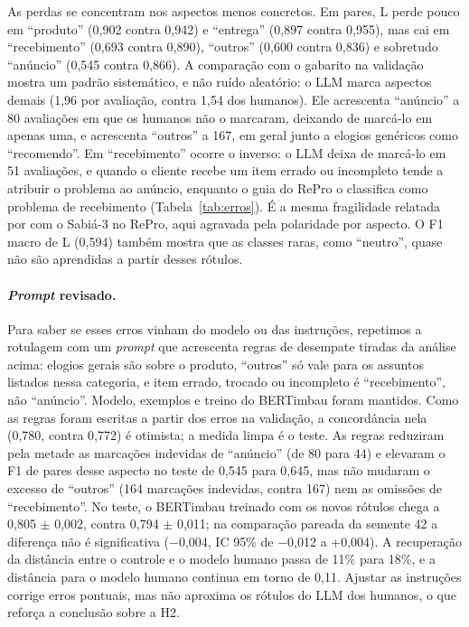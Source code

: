 \documentclass[a4paper, twocolumn, 11pt, twoside]{article}
\begin{document}
As perdas se concentram nos aspectos menos concretos. Em pares, L perde pouco em ``produto'' (0,902 contra 0,942) e ``entrega'' (0,897 contra 0,955), mas cai em ``recebimento'' (0,693 contra 0,890), ``outros'' (0,600 contra 0,836) e sobretudo ``anúncio'' (0,545 contra 0,866). A comparação com o gabarito na validação mostra um padrão sistemático, e não ruído aleatório: o LLM marca aspectos demais (1,96 por avaliação, contra 1,54 dos humanos). Ele acrescenta ``anúncio'' a 80 avaliações em que os humanos não o marcaram, deixando de marcá-lo em apenas uma, e acrescenta ``outros'' a 167, em geral junto a elogios genéricos como ``recomendo''. Em ``recebimento'' ocorre o inverso: o LLM deixa de marcá-lo em 51 avaliações, e quando o cliente recebe um item errado ou incompleto tende a atribuir o problema ao anúncio, enquanto o guia do RePro o classifica como problema de recebimento (Tabela~\ref{tab:erros}). É a mesma fragilidade relatada por \citet{silva2024sabia} com o Sabiá-3 no RePro, aqui agravada pela polaridade por aspecto. O F1 macro de L (0,594) também mostra que as classes raras, como ``neutro'', quase não são aprendidas a partir desses rótulos.

\paragraph{\emph{Prompt} revisado.} Para saber se esses erros vinham do modelo ou das instruções, repetimos a rotulagem com um \emph{prompt} que acrescenta regras de desempate tiradas da análise acima: elogios gerais são sobre o produto, ``outros'' só vale para os assuntos listados nessa categoria, e item errado, trocado ou incompleto é ``recebimento'', não ``anúncio''. Modelo, exemplos e treino do BERTimbau foram mantidos. Como as regras foram escritas a partir dos erros na validação, a concordância nela (0,780, contra 0,772) é otimista; a medida limpa é o teste. As regras reduziram pela metade as marcações indevidas de ``anúncio'' (de 80 para 44) e elevaram o F1 de pares desse aspecto no teste de 0,545 para 0,645, mas não mudaram o excesso de ``outros'' (164 marcações indevidas, contra 167) nem as omissões de ``recebimento''. No teste, o BERTimbau treinado com os novos rótulos chega a 0,805 $\pm$ 0,002, contra 0,794 $\pm$ 0,011; na comparação pareada da semente 42 a diferença não é significativa ($-$0,004, IC 95\% de $-$0,012 a +0,004). A recuperação da distância entre o controle e o modelo humano passa de 11\% para 18\%, e a distância para o modelo humano continua em torno de 0,11. Ajustar as instruções corrige erros pontuais, mas não aproxima os rótulos do LLM dos humanos, o que reforça a conclusão sobre a H2.
\end{document}

